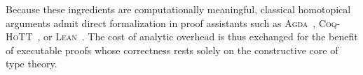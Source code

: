\medskip
\noindent
Because these ingredients are computationally meaningful, classical
homotopical arguments admit direct formalization in proof assistants
such as \textsc{Agda}~\cite{Agda}, \textsc{Coq-HoTT}~\cite{bauer2016hottlibraryformalizationhomotopy}, or \textsc{Lean}~\cite{10.1007/978-3-030-79876-5_37}.  The cost
of analytic overhead is thus exchanged for the benefit of executable
proofs whose correctness rests solely on the constructive core of
type theory.
